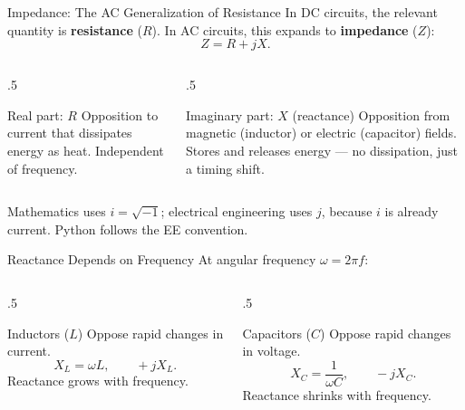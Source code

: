 \documentclass[9pt,aspectratio=169,xcolor=table]{beamer}
\begin{document}
\begin{frame}{Impedance: The AC Generalization of Resistance}
    \leavevmode
    In DC circuits, the relevant quantity is \textbf{resistance} ($R$).
    In AC circuits, this expands to \textbf{impedance} ($Z$):
    \[
    Z = R + jX.
    \]

    \vspace{2mm}
    \begin{columns}[t]
        \begin{column}{.5\textwidth}
            \begin{block}{Real part: $R$}
                \small Opposition to current that dissipates energy as
                heat. Independent of frequency.
            \end{block}
        \end{column}
        \begin{column}{.5\textwidth}
            \begin{block}{Imaginary part: $X$ (reactance)}
                \small Opposition from magnetic (inductor) or electric
                (capacitor) fields. Stores and releases energy --- no
                dissipation, just a timing shift.
            \end{block}
        \end{column}
    \end{columns}

    \vspace{2mm}
    {\small Mathematics uses $i=\sqrt{-1}$; electrical engineering uses
    $j$, because $i$ is already current. Python follows the EE
    convention.}
\end{frame}

\begin{frame}{Reactance Depends on Frequency}
    \leavevmode
    At angular frequency $\omega = 2\pi f$:

    \vspace{3mm}
    \begin{columns}[t]
        \begin{column}{.5\textwidth}
            \begin{block}{Inductors ($L$)}
                \small Oppose \alert{rapid changes in current}.
                \[
                X_L = \omega L, \qquad +jX_L.
                \]
                Reactance \alert{grows} with frequency.
            \end{block}
        \end{column}
        \begin{column}{.5\textwidth}
            \begin{block}{Capacitors ($C$)}
                \small Oppose \alert{rapid changes in voltage}.
                \[
                X_C = \frac{1}{\omega C}, \qquad -jX_C.
                \]
                Reactance \alert{shrinks} with frequency.
            \end{block}
        \end{column}
    \end{columns}
\end{frame}
\end{document}
